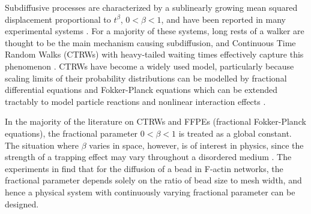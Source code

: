 \documentclass[a4paper,12pt]{elsarticle}
\numberwithin{equation}{section}
\theoremstyle{plain}
\theoremstyle{definition}
\theoremstyle{remark}
\numberwithin{equation}{section}
\newcommand{\1}{\mathbf 1}
\begin{document}
Subdiffusive processes are characterized by a sublinearly growing mean squared
displacement proportional to $t^\beta$, $0 < \beta < 1$, and have been reported
in many experimental systems
\cite{Metzler2000,TMT04,Santamaria2006a,Banks2005,Regner2013}.
For a majority of these systems, long rests of a walker are thought to be the
main mechanism causing subdiffusion, and Continuous Time Random Walks (CTRWs)
with heavy-tailed waiting times effectively capture this phenomenon
\cite{Scher1975,BG1990,Metzler2000}.  CTRWs have become a widely used model,
particularly because scaling limits of their probability distributions can be
modelled by fractional differential equations and Fokker-Planck equations
\cite{BMK00,Baeumer2001,HLS10PRL,Hahn11} which can be extended tractably to
model particle reactions \cite{Langlands2008d,Angstmann2013} and nonlinear
interaction effects \cite{StrakaFedotov14}.

In the majority of the literature on CTRWs and FFPEs (fractional Fokker-Planck
equations), the
fractional parameter $0 < \beta < 1$ is treated as a global constant.  The
situation where $\beta$ varies in space, however, is of interest in physics,
since the strength of a trapping effect may vary throughout a disordered
medium
\cite{Wong04,Korabel2010,Stickler2011,Fedotov2012,StrakaFedotov14}.
The experiments in \cite{Wong04} find that for the diffusion of a bead in
F-actin networks, the fractional parameter depends solely on the ratio of
bead size to mesh width, and hence a physical system with continuously varying
fractional parameter can be designed.
\end{document}
